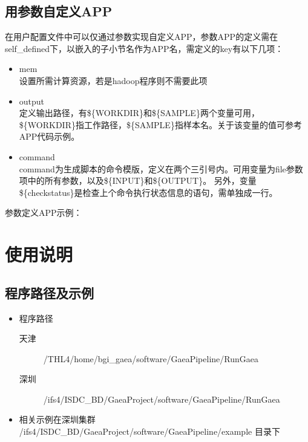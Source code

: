 \documentclass[UTF8,10pt,a4paper]{ctexart}
\begin{document}
\subsection{用参数自定义APP}
在用户配置文件中可以仅通过参数实现自定义APP，参数APP的定义需在self\_defined下，以嵌入的子小节名作为APP名，需定义的key有以下几项：
\begin{itemize}
\item mem\\
设置所需计算资源，若是hadoop程序则不需要此项
\item output\\
定义输出路径，有\$\{WORKDIR\}和\$\{SAMPLE\}两个变量可用，\$\{WORKDIR\}指工作路径，\$\{SAMPLE\}指样本名。关于该变量的值可参考APP代码示例。
\item command\\
command为生成脚本的命令模版，定义在两个三引号内。可用变量为file参数项中的所有参数，以及\$\{INPUT\}和\$\{OUTPUT\}。
另外，变量\$\{checkstatus\}是检查上个命令执行状态信息的语句，需单独成一行。
\end{itemize}


参数定义APP示例：



%

\section{使用说明}
%

\subsection{程序路径及示例}

\begin{itemize}
\item 程序路径
\begin{description}
\item[ 天津] /THL4/home/bgi\_gaea/software/GaeaPipeline/RunGaea
\item[ 深圳] /ifs4/ISDC\_BD/GaeaProject/software/GaeaPipeline/RunGaea
\end{description}
\item 相关示例在深圳集群 /ifs4/ISDC\_BD/GaeaProject/software/GaeaPipeline/example 目录下
\end{itemize}
\end{document}
